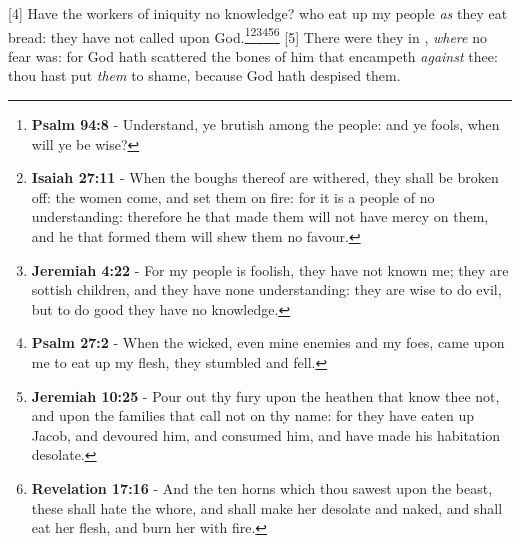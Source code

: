 [4] \textcolor[cmyk]{0.99998,1,0,0}{Have the workers of iniquity no knowledge? who eat up my people \emph{as} they eat bread: they have not called upon God.}\footnote{\textbf{Psalm 94:8} - Understand, ye brutish among the people: and ye fools, when will ye be wise?}\footnote{\textbf{Isaiah 27:11} - When the boughs thereof are withered, they shall be broken off: the women come, and set them on fire: for it is a people of no understanding: therefore he that made them will not have mercy on them, and he that formed them will shew them no favour.}\footnote{\textbf{Jeremiah 4:22} - For my people is foolish, they have not known me; they are sottish children, and they have none understanding: they are wise to do evil, but to do good they have no knowledge.}\footnote{\textbf{Psalm 27:2} - When the wicked, even mine enemies and my foes, came upon me to eat up my flesh, they stumbled and fell.}\footnote{\textbf{Jeremiah 10:25} - Pour out thy fury upon the heathen that know thee not, and upon the families that call not on thy name: for they have eaten up Jacob, and devoured him, and consumed him, and have made his habitation desolate.}\footnote{\textbf{Revelation 17:16} - And the ten horns which thou sawest upon the beast, these shall hate the whore, and shall make her desolate and naked, and shall eat her flesh, and burn her with fire.}
[5] \textcolor[cmyk]{0.99998,1,0,0}{There were they in , \emph{where} no fear was: for God hath scattered the bones of him that encampeth \emph{against} thee: thou hast put \emph{them} to shame, because God hath despised them.}
